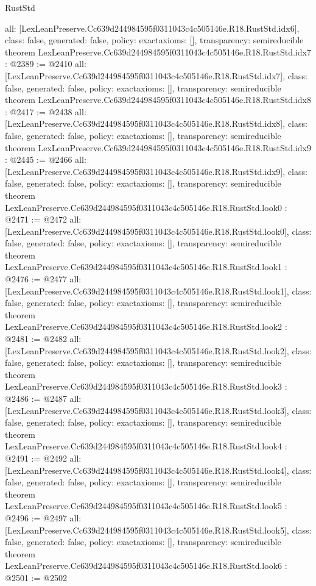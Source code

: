 \begin{lexlean}{RustStd}
\begin{coremodule}
{  all: [LexLeanPreserve.Cc639d244984595f0311043c4c505146e.R18.RustStd.idx6],
  class: false,
  generated: false,
  policy: exact{axioms: []},
  transparency: semireducible
}
theorem LexLeanPreserve.Cc639d244984595f0311043c4c505146e.R18.RustStd.idx7 : @2389 := @2410 {
  all: [LexLeanPreserve.Cc639d244984595f0311043c4c505146e.R18.RustStd.idx7],
  class: false,
  generated: false,
  policy: exact{axioms: []},
  transparency: semireducible
}
theorem LexLeanPreserve.Cc639d244984595f0311043c4c505146e.R18.RustStd.idx8 : @2417 := @2438 {
  all: [LexLeanPreserve.Cc639d244984595f0311043c4c505146e.R18.RustStd.idx8],
  class: false,
  generated: false,
  policy: exact{axioms: []},
  transparency: semireducible
}
theorem LexLeanPreserve.Cc639d244984595f0311043c4c505146e.R18.RustStd.idx9 : @2445 := @2466 {
  all: [LexLeanPreserve.Cc639d244984595f0311043c4c505146e.R18.RustStd.idx9],
  class: false,
  generated: false,
  policy: exact{axioms: []},
  transparency: semireducible
}
theorem LexLeanPreserve.Cc639d244984595f0311043c4c505146e.R18.RustStd.look0 : @2471 := @2472 {
  all: [LexLeanPreserve.Cc639d244984595f0311043c4c505146e.R18.RustStd.look0],
  class: false,
  generated: false,
  policy: exact{axioms: []},
  transparency: semireducible
}
theorem LexLeanPreserve.Cc639d244984595f0311043c4c505146e.R18.RustStd.look1 : @2476 := @2477 {
  all: [LexLeanPreserve.Cc639d244984595f0311043c4c505146e.R18.RustStd.look1],
  class: false,
  generated: false,
  policy: exact{axioms: []},
  transparency: semireducible
}
theorem LexLeanPreserve.Cc639d244984595f0311043c4c505146e.R18.RustStd.look2 : @2481 := @2482 {
  all: [LexLeanPreserve.Cc639d244984595f0311043c4c505146e.R18.RustStd.look2],
  class: false,
  generated: false,
  policy: exact{axioms: []},
  transparency: semireducible
}
theorem LexLeanPreserve.Cc639d244984595f0311043c4c505146e.R18.RustStd.look3 : @2486 := @2487 {
  all: [LexLeanPreserve.Cc639d244984595f0311043c4c505146e.R18.RustStd.look3],
  class: false,
  generated: false,
  policy: exact{axioms: []},
  transparency: semireducible
}
theorem LexLeanPreserve.Cc639d244984595f0311043c4c505146e.R18.RustStd.look4 : @2491 := @2492 {
  all: [LexLeanPreserve.Cc639d244984595f0311043c4c505146e.R18.RustStd.look4],
  class: false,
  generated: false,
  policy: exact{axioms: []},
  transparency: semireducible
}
theorem LexLeanPreserve.Cc639d244984595f0311043c4c505146e.R18.RustStd.look5 : @2496 := @2497 {
  all: [LexLeanPreserve.Cc639d244984595f0311043c4c505146e.R18.RustStd.look5],
  class: false,
  generated: false,
  policy: exact{axioms: []},
  transparency: semireducible
}
theorem LexLeanPreserve.Cc639d244984595f0311043c4c505146e.R18.RustStd.look6 : @2501 := @2502 {
}
\end{coremodule}
\end{lexlean}
